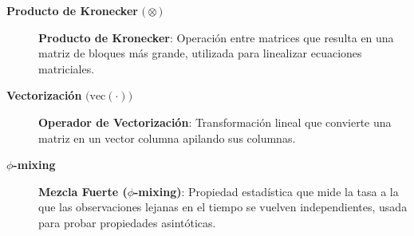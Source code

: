 \begin{description}
\item[\textbf{Producto de Kronecker} \(\bigl(\otimes\bigr)\)]
\textbf{Producto de Kronecker}:
Operación entre matrices que resulta en una matriz de bloques más grande, utilizada para linealizar ecuaciones matriciales.
\end{description}

\begin{description}
\item[\textbf{Vectorización} \(\bigl(\text{vec}(\cdot)\bigr)\)]
\textbf{Operador de Vectorización}:
Transformación lineal que convierte una matriz en un vector columna apilando sus columnas.
\end{description}

\begin{description}
\item[\textbf{\(\phi\)-mixing}]
\textbf{Mezcla Fuerte (\(\phi\)-mixing)}:
Propiedad estadística que mide la tasa a la que las observaciones lejanas en el tiempo se vuelven independientes, usada para probar propiedades asintóticas.
\end{description}
